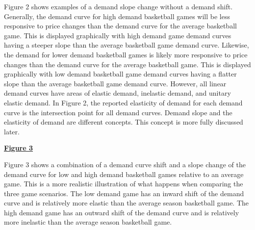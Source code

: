 \documentclass[preprint,12pt,times]{elsarticle}
\begin{document}
Figure 2 shows examples of a demand slope change without a demand shift.  Generally, the demand curve for high demand basketball games will be less responsive to price changes than the demand curve for the average basketball game.  This is displayed graphically with high demand game demand curves having a steeper slope than the average basketball game demand curve.  Likewise, the demand for lower demand basketball games is likely more responsive to price changes than the demand curve for the average basketball game.  This is displayed graphically with low demand basketball game demand curves having a flatter slope than the average basketball game demand curve.  However, all linear demand curves have areas of elastic demand, inelastic demand, and unitary elastic demand.  In Figure 2, the reported elasticity of demand for each demand curve is the intersection point for all demand curves.  Demand slope and the elasticity of demand are different concepts.  This concept is more fully discussed later.\\

\begin{large}
\ul{\textbf{Figure 3}}
\end{large}

\begin{flushleft}
\end{flushleft}

Figure 3 shows a combination of a demand curve shift and a slope change of the demand curve for low and high demand basketball games relative to an average game.  This is a more realistic illustration of what happens when comparing the three game scenarios.  The low demand game has an inward shift of the demand curve and is relatively more elastic than the average season basketball game.  The high demand game has an outward shift of the demand curve and is relatively more inelastic than the average season basketball game.
\end{document}
